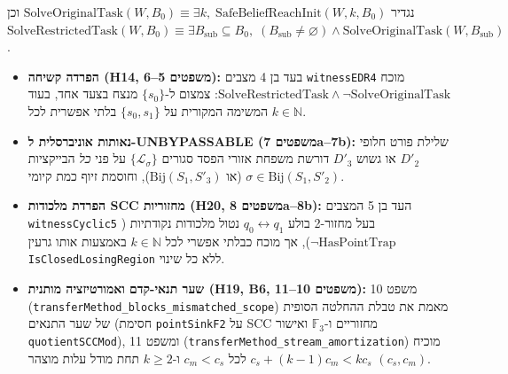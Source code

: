 \documentclass[10pt,a4paper]{article}
\newcommand{\code}[1]{\foreignlanguage{english}{\nolinkurl{#1}}}
\newcommand{\ltr}[1]{\foreignlanguage{english}{#1}}
\begin{document}
נגדיר $\mathrm{SolveOriginalTask}(W, B_0) \equiv \exists k,\; \mathrm{SafeBeliefReachInit}(W, k, B_0)$ וכן $\mathrm{SolveRestrictedTask}(W, B_0) \equiv \exists B_{\mathrm{sub}} \subseteq B_0,\; (B_{\mathrm{sub}} \ne \varnothing) \land \mathrm{SolveOriginalTask}(W, B_{\mathrm{sub}})$.
\begin{itemize}
\item \textbf{הפרדה קשיחה (\ltr{H14}, משפטים 5--6):} בעד בן 4 מצבים \code{witnessEDR4} מוכח $\mathrm{SolveRestrictedTask} \land \neg\mathrm{SolveOriginalTask}$: צמצום ל-$\{s_0\}$ מנצח בצעד אחד, בעוד המשימה המקורית על $\{s_0, s_1\}$ בלתי אפשרית לכל $k \in \mathbb{N}$.
\item \textbf{נאותות אוניברסלית ל-\ltr{UNBYPASSABLE} (משפטים \ltr{7a--7b}):} שלילת פורט חלופי $D'_2$ או גשוש $D'_3$ דורשת משפחת אזורי הפסד סגורים $\{\mathcal{L}_\sigma\}$ על פני \emph{כל} הבייקציות $\sigma \in \mathrm{Bij}(S_1, S'_2)$ (או $\mathrm{Bij}(S_1, S'_3)$), וחוסמת זיוף כמת קיומי.
\item \textbf{הפרדת מלכודות \ltr{SCC} מחזוריות (\ltr{H20}, משפטים \ltr{8a--8b}):} העד בן 5 המצבים \code{witnessCyclic5} בעל מחזור-2 בולע $q_0 \leftrightarrow q_1$ נטול מלכודות נקודתיות ($\neg\mathrm{HasPointTrap}$), אך מוכח כבלתי אפשרי לכל $k \in \mathbb{N}$ באמצעות אותו גרעין \code{IsClosedLosingRegion} ללא כל שינוי.
\item \textbf{שער תנאי-קדם ואמורטיזציה מותנית (\ltr{H19}, \ltr{B6}, משפטים 10--11):} משפט 10 (\code{transferMethod_blocks_mismatched_scope}) מאמת את טבלת ההחלטה הסופית של שער התנאים (חסימת \code{pointSinkF2} על \ltr{SCC} מחזוריים ו-$\mathbb{F}_3$ ואישור \code{quotientSCCMod}), ומשפט 11 (\code{transferMethod_stream_amortization}) מוכיח $c_s + (k-1)c_m < k c_s$ לכל $c_m < c_s$ ו-$k \ge 2$ תחת מודל עלות מוצהר $(c_s, c_m)$.
\end{itemize}
\end{document}
